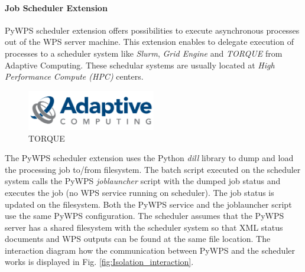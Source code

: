 \documentclass[12pt,a4paper]{article}
\begin{document}
\paragraph{Job Scheduler Extension}
PyWPS scheduler extension offers possibilities to execute asynchronous processes out of the WPS server machine.
This extension enables to delegate execution of processes to a scheduler system like \textit{Slurm}, \textit{Grid Engine} 
and \textit{TORQUE} from Adaptive Computing. These schedular systems are usually located at \textit{High Performance Compute (HPC)}
centers.

\begin{figure}[h!]
\centering
\begin{floatrow}
\end{floatrow}
\end{figure}

\begin{figure}[h!]
\centering
\includegraphics[width=0.5\textwidth]{img/Isolation_torque.png}
\caption{TORQUE}
\label{fig:Isolation_torque}
\end{figure}

The PyWPS scheduler extension uses the Python \textit{dill} library to dump and load the processing job to/from filesystem. The batch script executed on the scheduler system calls the PyWPS \textit{joblauncher} script with the dumped job status and executes the job (no WPS service running on scheduler). The job status is updated on the filesystem. Both the PyWPS service and the joblauncher script use the same PyWPS configuration. The scheduler assumes that the PyWPS server has a shared filesystem with the scheduler system so that XML status documents and WPS outputs can be found at the same file location. The interaction diagram how the communication between PyWPS and the scheduler works is displayed in Fig. \ref{fig:Isolation_interaction}.
\end{document}
